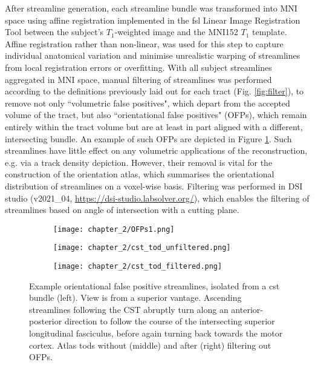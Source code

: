 After streamline generation, each streamline bundle was transformed into MNI space using affine registration implemented in the \gls{fsl} Linear Image Registration Tool\autocite{Jenkinson2002} between the subject's $T_1$-weighted image and the MNI152 $T_1$ template.\autocite{Fonov2011}
Affine registration rather than non-linear, was used for this step to capture individual anatomical variation and minimise unrealistic warping of streamlines from local registration errors or overfitting.
With all subject streamlines aggregated in MNI space, manual filtering of streamlines was performed according to the definitions previously laid out for each tract (Fig. \ref{fig:filter}), to remove not only ``volumetric false positives", which depart from the accepted volume of the tract, but also ``orientational false positives" (OFPs), which remain entirely within the tract volume but are at least in part aligned with a different, intersecting bundle.
An example of such OFPs are depicted in Figure \ref{fig:ofps}. Such streamlines have little effect on any volumetric applications of the reconstruction, e.g. via a track density depiction.
However, their removal is vital for the construction of the orientation atlas, which summarises the orientational distribution of streamlines on a voxel-wise basis.
Filtering was performed in DSI studio (v2021\_04, \url{https://dsi-studio.labsolver.org/})\autocite{Yeh2021a}, which enables the filtering of streamlines based on angle of intersection with a cutting plane.

\begin{figure}[htb!]
  \centering
  \begin{subfigure}{0.3\textwidth}
    \texttt{[image: chapter\_2/OFPs1.png]}
  \end{subfigure}\hfill%
  \begin{subfigure}{0.3\textwidth}
    \texttt{[image: chapter\_2/cst\_tod\_unfiltered.png]}
  \end{subfigure}\hfill%
  \begin{subfigure}{0.3\textwidth}
    \texttt{[image: chapter\_2/cst\_tod\_filtered.png]}
  \end{subfigure}%
  \caption{Example orientational false positive streamlines, isolated from a \gls{cst} bundle (left).
  View is from a superior vantage. Ascending streamlines following the CST abruptly turn along an anterior-posterior direction to follow the course of the intersecting superior longitudinal fasciculus, before again turning back towards the motor cortex.
  Atlas \glspl{tod} without (middle) and after (right) filtering out OFPs.}
  \label{fig:ofps}
\end{figure}

